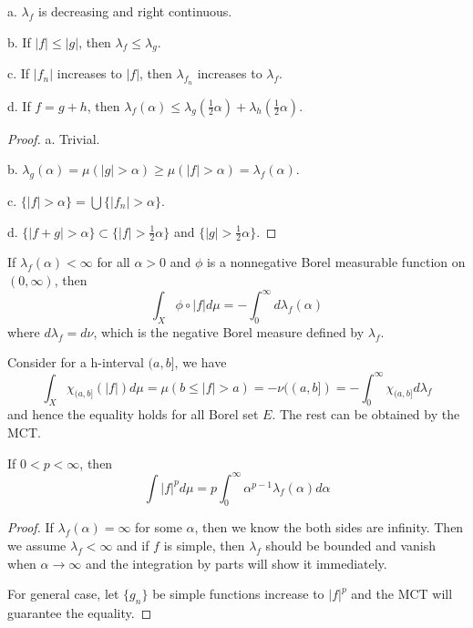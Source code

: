 \documentclass[lang=en, color=blue, ]{elegantbook}
\newcommand{\dstrb}[1]{\lambda_{#1}}
\begin{document}
\begin{proposition}
    a. $\dstrb{f}$ is decreasing and right continuous.\par
    b. If $|f|\leq |g|$, then $\dstrb{f} \leq \dstrb{g}$.\par
    c. If $|f_n|$ increases to $|f|$, then $\dstrb{f_n}$ increases to $\dstrb{f}$.\par
    d. If $f = g+h$, then $\dstrb{f}(\alpha) \leq \dstrb{g}(\tfrac{1}{2}\alpha)+\dstrb{h}(\tfrac{1}{2}\alpha)$.
\end{proposition}
\begin{proof}\par
    a. Trivial.\par
    b. $\dstrb{g}(\alpha) = \mu(|g|>\alpha) \geq \mu(|f|>\alpha) = \dstrb{f}(\alpha)$.\par
    c. $\{|f| > \alpha\} = \bigcup \{|f_n| > \alpha\}$.\par
    d. $\{|f+g|>\alpha\} \subset \{|f|>\tfrac{1}{2}\alpha\}$ and $\{|g|>\tfrac{1}{2}\alpha\}$.
\end{proof}

\begin{proposition}
    If $\dstrb{f}(\alpha) < \infty$ for all $\alpha > 0$ and $\phi$ is a nonnegative Borel measurable function on $(0,\infty)$, then
    \[\int_X \phi\circ |f|d\mu = - \int_0^{\infty}d\dstrb{f}(\alpha)\]
    where $d\dstrb{f} = d\nu$, which is the negative Borel measure defined by $\dstrb{f}$.
\end{proposition}
\begin{proposition}
    Consider for a h-interval $(a,b]$, we have
    \[\int_X \chi_{(a,b]}(|f|)d\mu = \mu(b\leq |f|>a) = -\nu((a,b]) = - \int_0^{\infty} \chi_{(a,b]} d\dstrb{f}\]
    and hence the equality holds for all Borel set $E$. The rest can be obtained by the MCT.
\end{proposition}

\begin{proposition}
    If $0<p<\infty$, then
    \[\int |f|^p d\mu = p\int_0^{\infty}\alpha^{p-1}\dstrb{f}(\alpha)d\alpha\]
\end{proposition}
\begin{proof}\par
    If $\dstrb{f}(\alpha) = \infty$ for some $\alpha$, then we know the both sides are infinity. Then we assume $\dstrb{f}<\infty$ and if $f$ is simple, then $\dstrb{f}$ should be bounded and vanish when $\alpha \to \infty$ and the integration by parts will show it immediately.\par
    For general case, let $\{g_n\}$ be simple functions increase to $|f|^p$ and the MCT will guarantee the equality.
\end{proof}
\end{document}
